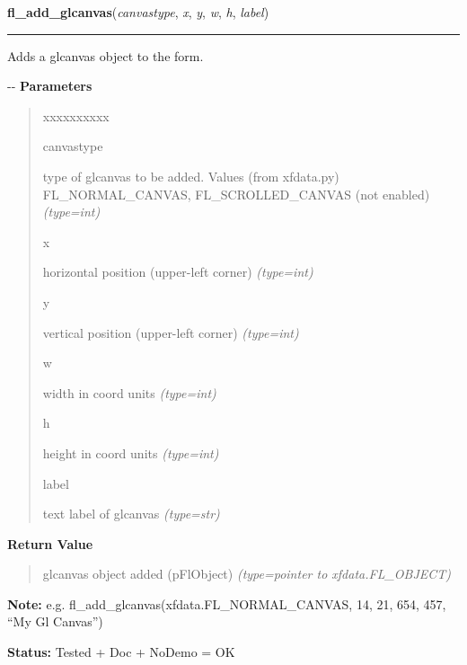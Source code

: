     \vspace{0.5ex}

\hspace{.8\funcindent}\begin{boxedminipage}{\funcwidth}

    \raggedright \textbf{fl\_add\_glcanvas}(\textit{canvastype}, \textit{x}, \textit{y}, \textit{w}, \textit{h}, \textit{label})

    \vspace{-1.5ex}

    \rule{\textwidth}{0.5\fboxrule}
\setlength{\parskip}{2ex}

Adds a glcanvas object to the form.

-{}-
\setlength{\parskip}{1ex}
      \textbf{Parameters}
      \vspace{-1ex}

      \begin{quote}
        \begin{Ventry}{xxxxxxxxxx}

          \item[canvastype]


type of glcanvas to be added. Values (from xfdata.py) FL\_NORMAL\_CANVAS,
FL\_SCROLLED\_CANVAS (not enabled)
            {\it (type=int)}

          \item[x]


horizontal position (upper-left corner)
            {\it (type=int)}

          \item[y]


vertical position (upper-left corner)
            {\it (type=int)}

          \item[w]


width in coord units
            {\it (type=int)}

          \item[h]


height in coord units
            {\it (type=int)}

          \item[label]


text label of glcanvas
            {\it (type=str)}

        \end{Ventry}

      \end{quote}

      \textbf{Return Value}
    \vspace{-1ex}

      \begin{quote}

glcanvas object added (pFlObject)
      {\it (type=pointer to xfdata.FL\_OBJECT)}

      \end{quote}

\textbf{Note:} 
e.g. fl\_add\_glcanvas(xfdata.FL\_NORMAL\_CANVAS, 14, 21, 654, 457,
``My Gl Canvas'')


\textbf{Status:} 
Tested + Doc + NoDemo = OK


    \end{boxedminipage}


